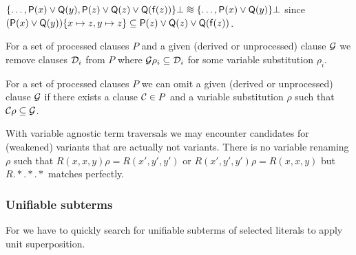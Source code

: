 \begin{example}
	\(
		\{ \ldots,
		\mP(x)\lor \mQ(y), \mP(z)\lor\mQ(z) \lor \mQ(\mf(z)) \}\bot
		\equisat
		\{ \ldots, \mP(x) \lor \mQ(y) \}\bot
	\)
	since \(
		(\mathsf{P}(x)\lor\mathsf{Q}(y)) \{x\mapsto z, y\mapsto z \}
		\subseteq
		\mathsf{P}(z)\lor\mathsf{Q}(z)\lor\mathsf{Q}(\mathsf{f}(z))
	\).
\end{example}

\begin{definition}
	For a set of processed clauses \( P \)
	and a given (derived or unprocessed) clause \( \mathcal{G} \) we
	 remove clauses \( \mathcal{D}_i \) from \( P \) where
	 \( \mathcal{G}\rho_i \subseteq \mathcal{D}_i \) for some
	 variable substitution \( \rho_i \).
\end{definition}

\begin{definition}
	For a set of processed clauses \( P \)
	we can omit a given (derived or unprocessed) clause \( \mathcal{G} \)
	if there exists a clause \( \mathcal{C} \in P \)
	and a variable substitution \( \rho \) such that \( \mathcal{C}\rho\subseteq \mathcal{G} \).
\end{definition}

	\begin{example}
		With variable agnostic term traversals we may encounter
		candidates for (weakened) variants that are actually not variants.
		There is no variable renaming \( \rho \) such that
		\( R(x,x,y) \rho = R(x',y',y') \) or
		\( R(x',y',y') \rho = R(x,x,y) \)
		but \( R.*.*.* \) matches perfectly.
	\end{example}

\subsubsection{Unifiable subterms}

For \InstGenEQ we have to quickly search for unifiable subterms of selected literals to apply unit superposition.

